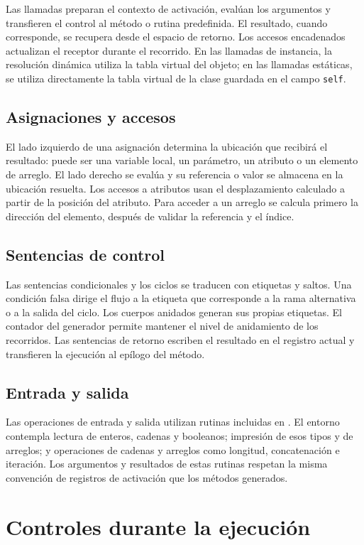Las llamadas preparan el contexto de activación, evalúan los argumentos
y transfieren el control al método o rutina predefinida. El resultado,
cuando corresponde, se recupera desde el espacio de retorno. Los
accesos encadenados actualizan el receptor durante el recorrido. En las
llamadas de instancia, la resolución dinámica utiliza la tabla virtual
del objeto; en las llamadas estáticas, se utiliza directamente la tabla
virtual de la clase guardada en el campo \texttt{self}.

\subsection{Asignaciones y accesos}
El lado izquierdo de una asignación determina la ubicación que recibirá
el resultado: puede ser una variable local, un parámetro, un atributo o
un elemento de arreglo. El lado derecho se evalúa y su referencia o valor
se almacena en la ubicación resuelta. Los accesos a atributos usan el
desplazamiento calculado a partir de la posición del atributo. Para
acceder a un arreglo se calcula primero la dirección del elemento,
después de validar la referencia y el índice.

\subsection{Sentencias de control}
Las sentencias condicionales y los ciclos se traducen con etiquetas y
saltos. Una condición falsa dirige el flujo a la etiqueta que corresponde
a la rama alternativa o a la salida del ciclo. Los cuerpos anidados
generan sus propias etiquetas. El contador  del
generador permite mantener el nivel de anidamiento de los recorridos.
Las sentencias de retorno escriben el resultado en el registro actual y
transfieren la ejecución al epílogo del método.

\subsection{Entrada y salida}
Las operaciones de entrada y salida utilizan rutinas incluidas en
. El entorno contempla lectura de enteros, cadenas y
booleanos; impresión de esos tipos y de arreglos; y operaciones de
cadenas y arreglos como longitud, concatenación e iteración. Los
argumentos y resultados de estas rutinas respetan la misma convención de
registros de activación que los métodos generados.

\section{Controles durante la ejecución}
\label{sec:controles-runtime}

